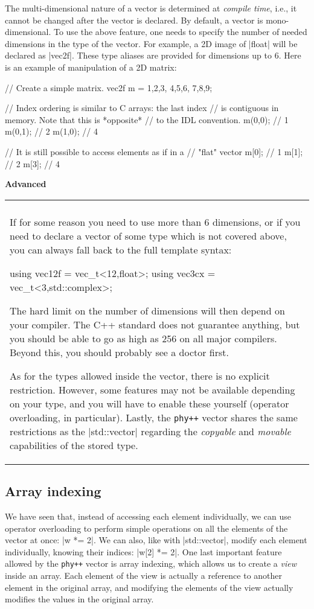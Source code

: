 \documentclass[12pt]{report}
\newcommand{\phypp}{\texttt{phy++}\xspace}
\newcommand{\stdvec}{\cppinline|std::vector|\xspace}
\newenvironment{advanced}
{
    \vspace{0.3cm}\noindent \textbf{Advanced} \\
    \noindent\begin{tabular}{p{0.95\textwidth}}
    \hline\\[-0.3cm]
}
{
    \\[0.2cm]\hline
    \end{tabular}
}
\begin{document}
The multi-dimensional nature of a vector is determined at \emph{compile time}, i.e., it cannot be changed after the vector is declared. By default, a vector is mono-dimensional. To use the above feature, one needs to specify the number of needed dimensions in the type of the vector. For example, a 2D image of \cppinline|float| will be declared as \cppinline|vec2f|. These type aliases are provided for dimensions up to $6$. Here is an example of manipulation of a 2D matrix:

\begin{cppcode}
// Create a simple matrix.
vec2f m = {{1,2,3}, {4,5,6}, {7,8,9}};

// Index ordering is similar to C arrays: the last index
// is contiguous in memory. Note that this is *opposite*
// to the IDL convention.
m(0,0); // 1
m(0,1); // 2
m(1,0); // 4

// It is still possible to access elements as if in a
// "flat" vector
m[0]; // 1
m[1]; // 2
m[3]; // 4
\end{cppcode}

\begin{advanced}
If for some reason you need to use more than 6 dimensions, or if you need to declare a vector of some type which is not covered above, you can always fall back to the full template syntax:
\begin{cppcode}
using vec12f = vec_t<12,float>;
using vec3cx = vec_t<3,std::complex>;
\end{cppcode}

The hard limit on the number of dimensions will then depend on your compiler. The C++ standard does not guarantee anything, but you should be able to go as high as 256 on all major compilers. Beyond this, you should probably see a doctor first.

As for the types allowed inside the vector, there is no explicit restriction. However, some features may not be available depending on your type, and you will have to enable these yourself (operator overloading, in particular). Lastly, the \phypp vector shares the same restrictions as the \stdvec regarding the \emph{copyable} and \emph{movable} capabilities of the stored type.
\end{advanced}

\subsection{Array indexing \label{SEC:core:overview:array_index}}

We have seen that, instead of accessing each element individually, we can use operator overloading to perform simple operations on all the elements of the vector at once: \cppinline|w *= 2|. We can also, like with \stdvec, modify each element individually, knowing their indices: \cppinline|w[2] *= 2|. One last important feature allowed by the \phypp vector is array indexing, which allows us to create a \emph{view} inside an array. Each element of the view is actually a reference to another element in the original array, and modifying the elements of the view actually modifies the values in the original array.
\end{document}
